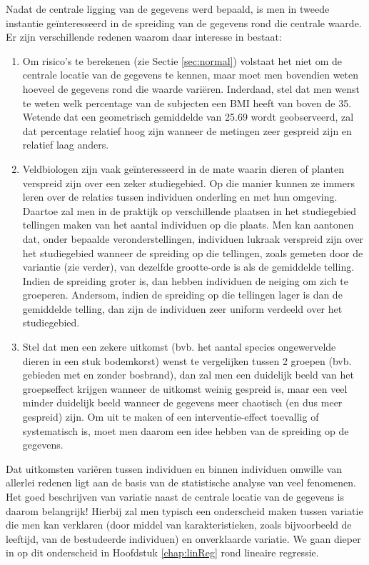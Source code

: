 \documentclass[12pt,dutch,coursenotes]{book}
\providecommand{\tightlist}{%
  \setlength{\itemsep}{0pt}\setlength{\parskip}{0pt}}
\theoremstyle{definition}
\theoremstyle{definition}
\theoremstyle{definition}
\theoremstyle{remark}
\begin{document}
Nadat de centrale ligging van de gegevens werd bepaald, is men in tweede
instantie geïnteresseerd in de spreiding van de gegevens rond die
centrale waarde. Er zijn verschillende redenen waarom daar interesse in
bestaat:

\begin{enumerate}
\def\labelenumi{\arabic{enumi}.}
\tightlist
\item
  Om risico's te berekenen (zie Sectie \ref{sec:normal}) volstaat het
  niet om de centrale locatie van de gegevens te kennen, maar moet men
  bovendien weten hoeveel de gegevens rond die waarde variëren.
  Inderdaad, stel dat men wenst te weten welk percentage van de
  subjecten een BMI heeft van boven de 35. Wetende dat een geometrisch
  gemiddelde van 25.69 wordt geobserveerd, zal dat percentage relatief
  hoog zijn wanneer de metingen zeer gespreid zijn en relatief laag
  anders.
\item
  Veldbiologen zijn vaak geïnteresseerd in de mate waarin dieren of
  planten verspreid zijn over een zeker studiegebied. Op die manier
  kunnen ze immers leren over de relaties tussen individuen onderling en
  met hun omgeving. Daartoe zal men in de praktijk op verschillende
  plaatsen in het studiegebied tellingen maken van het aantal individuen
  op die plaats. Men kan aantonen dat, onder bepaalde
  veronderstellingen, individuen lukraak verspreid zijn over het
  studiegebied wanneer de spreiding op die tellingen, zoals gemeten door
  de variantie (zie verder), van dezelfde grootte-orde is als de
  gemiddelde telling. Indien de spreiding groter is, dan hebben
  individuen de neiging om zich te groeperen. Andersom, indien de
  spreiding op die tellingen lager is dan de gemiddelde telling, dan
  zijn de individuen zeer uniform verdeeld over het studiegebied.
\item
  Stel dat men een zekere uitkomst (bvb. het aantal species ongewervelde
  dieren in een stuk bodemkorst) wenst te vergelijken tussen 2 groepen
  (bvb. gebieden met en zonder bosbrand), dan zal men een duidelijk
  beeld van het groepseffect krijgen wanneer de uitkomst weinig gespreid
  is, maar een veel minder duidelijk beeld wanneer de gegevens meer
  chaotisch (en dus meer gespreid) zijn. Om uit te maken of een
  interventie-effect toevallig of systematisch is, moet men daarom een
  idee hebben van de spreiding op de gegevens.
\end{enumerate}

Dat uitkomsten variëren tussen individuen en binnen individuen omwille
van allerlei redenen ligt aan de basis van de statistische analyse van
veel fenomenen. Het goed beschrijven van variatie naast de centrale
locatie van de gegevens is daarom belangrijk! Hierbij zal men typisch
een onderscheid maken tussen variatie die men kan verklaren (door middel
van karakteristieken, zoals bijvoorbeeld de leeftijd, van de bestudeerde
individuen) en onverklaarde variatie. We gaan dieper in op dit
onderscheid in Hoofdstuk \ref{chap:linReg} rond lineaire regressie.
\end{document}
